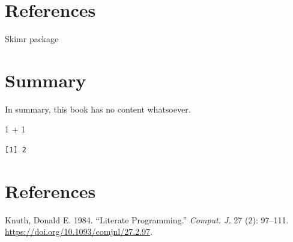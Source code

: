 \documentclass[
  letterpaper,
  DIV=11,
  numbers=noendperiod]{scrreprt}
\newenvironment{Shaded}{\begin{snugshade}}{\end{snugshade}}
\newcommand{\DecValTok}[1]{\textcolor[rgb]{0.68,0.00,0.00}{#1}}
\newcommand{\SpecialCharTok}[1]{\textcolor[rgb]{0.37,0.37,0.37}{#1}}
\newlength{\cslhangindent}
\newlength{\cslentryspacingunit} %
\newenvironment{CSLReferences}[2] %
 {%
  \setlength{\parindent}{0pt}
  \ifodd #1
  \let\oldpar\par
  \def\par{\hangindent=\cslhangindent\oldpar}
  \fi
  \setlength{\parskip}{#2\cslentryspacingunit}
 }%
 {}
\begin{document}

\hypertarget{references-1}{%
\chapter{References}\label{references-1}}

Skimr package


\hypertarget{summary}{%
\chapter{Summary}\label{summary}}

In summary, this book has no content whatsoever.

\begin{Shaded}
\begin{Highlighting}[]
\DecValTok{1} \SpecialCharTok{+} \DecValTok{1}
\end{Highlighting}
\end{Shaded}

\begin{verbatim}
[1] 2
\end{verbatim}


\hypertarget{references-2}{%
\chapter*{References}\label{references-2}}

\hypertarget{refs}{}
\begin{CSLReferences}{1}{0}
\leavevmode{}%
Knuth, Donald E. 1984. {``Literate Programming.''} \emph{Comput. J.} 27
(2): 97--111. \url{https://doi.org/10.1093/comjnl/27.2.97}.

\end{CSLReferences}
\end{document}
